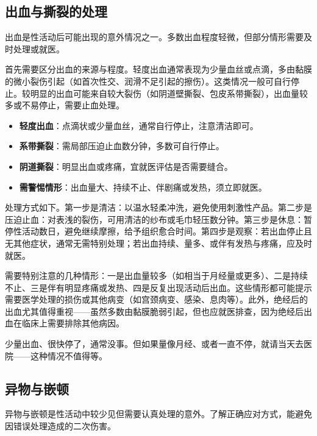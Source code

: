 \documentclass[12pt,UTF8]{ctexbook}
\newcommand{\keyword}[1]{\textbf{#1}}
\begin{document}
\subsection{出血与撕裂的处理}

出血是性活动后可能出现的意外情况之一。多数出血程度轻微，但部分情形需要及时处理或就医。

首先需要区分出血的来源与程度。轻度出血通常表现为少量血丝或点滴，多由黏膜的微小裂伤引起（如首次性交、润滑不足引起的擦伤）。这类情况一般可自行停止。较明显的出血可能来自较大裂伤（如阴道壁撕裂、包皮系带撕裂），出血量较多或不易停止，需要止血处理。

\begin{itemize}
  \item \keyword{轻度出血}：点滴状或少量血丝，通常自行停止，注意清洁即可。
  \item \keyword{系带撕裂}：需局部压迫止血数分钟，多数可自行停止。
  \item \keyword{阴道撕裂}：明显出血或疼痛，宜就医评估是否需要缝合。
  \item \keyword{需警惕情形}：出血量大、持续不止、伴剧痛或发热，须立即就医。
\end{itemize}

处理方式如下。第一步是清洁：以温水轻柔冲洗，避免使用刺激性产品。第二步是压迫止血：对表浅的裂伤，可用清洁的纱布或毛巾轻压数分钟。第三步是休息：暂停性活动数日，避免继续摩擦，给予组织愈合时间。第四步是观察：若出血停止且无其他症状，通常无需特别处理；若出血持续、量多、或伴有发热与疼痛，应及时就医。

需要特别注意的几种情形：一是出血量较多（如相当于月经量或更多）、二是持续不止、三是伴有明显疼痛或发热、四是反复出现活动后出血。这些情形都可能提示需要医学处理的损伤或其他病变（如宫颈病变、感染、息肉等）。此外，绝经后的出血尤其值得重视——虽然多数由黏膜脆弱引起，但也应就医排查，因为绝经后出血在临床上需要排除其他病因。

\begin{tcolorbox}[colback=pink!5!white,colframe=red!50!black,title=贴心小叮咛]
少量出血、很快停了，通常没事。但如果量像月经、或者一直不停，就请当天去医院——这种情况不值得等。
\end{tcolorbox}

\subsection{异物与嵌顿}

异物与嵌顿是性活动中较少见但需要认真处理的意外。了解正确应对方式，能避免因错误处理造成的二次伤害。
\end{document}
